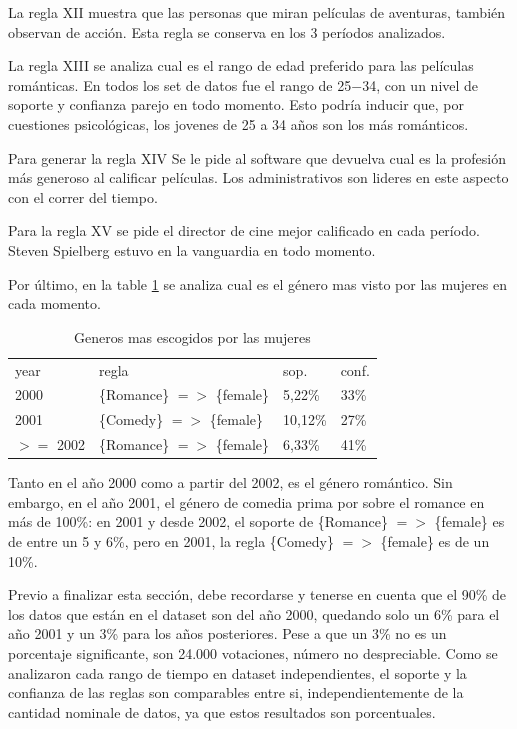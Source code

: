 \documentclass[journal]{IEEEtran}
\begin{document}
La regla XII muestra que las personas que miran películas de aventuras, también
observan de acción. Esta regla se conserva en los 3 períodos analizados.

La regla XIII se analiza cual es el rango de edad preferido para las películas
románticas. En todos los set de datos fue el rango de 25$-$34, con un nivel
de soporte y confianza parejo en todo momento. Esto podría inducir que, 
por cuestiones psicológicas, los jovenes de 25 a 34 años son los más 
románticos.

Para generar la regla XIV Se le pide al software que devuelva cual es la profesión
más generoso al calificar películas. Los administrativos son lideres en este
aspecto con el correr del tiempo.

Para la regla XV se pide el director de cine mejor calificado en cada período.
Steven Spielberg estuvo en la vanguardia en todo momento.

Por último, en la table \ref{genre_female} se analiza cual 
es el género mas visto por las mujeres en cada momento.

\begin{table}[ht!]
\caption{Generos mas escogidos por las mujeres}
\label{genre_female}
\centering
\begin{tabular}{l l l l }
year & regla & sop. & conf. \\
2000 & \{Romance\} $=$$>$ \{female\} & 5,22\% & 33\%  \\
2001 & \{Comedy\} $=$$>$ \{female\} & 10,12\% & 27\%  \\
$>$$=$ 2002 & \{Romance\} $=$$>$ \{female\} & 6,33\% & 41\%  \\
\end{tabular}
\end{table}

Tanto en el año 2000 como a partir del 2002, es el género romántico. Sin embargo, 
en el año 2001, el género de comedia prima por sobre el romance en más de 100\%:
en 2001 y desde 2002, el soporte de \{Romance\} $=$$>$ \{female\} es de entre
un 5 y 6\%, pero en 2001, la regla \{Comedy\} $=$$>$ \{female\} es de un 10\%.

Previo a finalizar esta sección, debe recordarse y tenerse en cuenta que 
 el 90\% de los datos que están en el dataset son del año 2000, quedando solo un 6\%
para el año 2001 y un 3\% para los años posteriores. Pese a que un  3\% 
no es un porcentaje significante, son 24.000 votaciones, número no despreciable.
Como se analizaron cada rango de tiempo en dataset independientes, el soporte
y la confianza de las reglas son comparables entre si, independientemente de la 
cantidad nominale de datos, ya que estos resultados son porcentuales.
\end{document}

